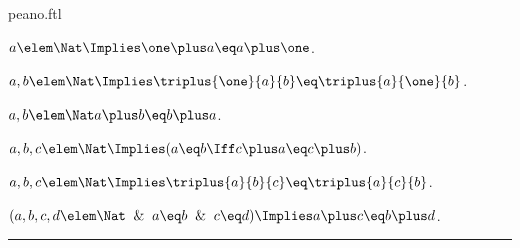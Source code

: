 \documentclass{article}
\begin{document}
\begin{smodule}{peano.ftl}
\begin{forthel}
  \begin{theorem*}[title=24,id=P24]
    $a \elem \Nat \Implies \one \plus a \eq a \plus \one$.
  \end{theorem*}

  \begin{theorem*}[title=24',id=P24prime]
    $a,b \elem \Nat \Implies \triplus{\one}{a}{b} \eq \triplus{a}{\one}{b}$.
  \end{theorem*}

  \begin{theorem*}[title=25,id=P25]
    $a,b \elem \Nat a \plus b \eq b \plus a$.
  \end{theorem*}

  \begin{theorem*}[title=26,id=P26]
    $a,b,c \elem \Nat \Implies (a \eq b \Iff c \plus a \eq c \plus b)$.
  \end{theorem*}

  \begin{theorem*}[title=27,id=P27]
    $a,b,c \elem \Nat \Implies \triplus{a}{b}{c} \eq \triplus{a}{c}{b}$.
  \end{theorem*}

  \begin{theorem*}[title=28,id=P28]
    $(a,b,c,d \elem \Nat \And a \eq b \And c \eq d) \Implies a \plus c \eq b \plus d$.
  \end{theorem*}
\end{forthel}

\vspace{1em}\hrule

\titleformat{\section}[hang]{\Large\bfseries}{}{0em}{}

\printbibliography
{}

\end{smodule}
\end{document}
